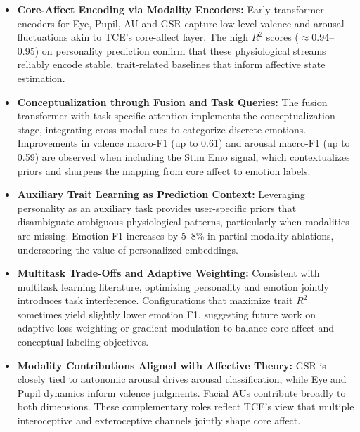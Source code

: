 \documentclass[sigconf]{acmart}
\begin{document}
\begin{itemize}
    \item \textbf{Core-Affect Encoding via Modality Encoders:} Early transformer encoders for Eye, Pupil, AU and GSR capture low-level valence and arousal fluctuations akin to TCE’s core-affect layer. The high $R^2$ scores ($\approx$0.94–0.95) on personality prediction confirm that these physiological streams reliably encode stable, trait-related baselines that inform affective state estimation.

    \item \textbf{Conceptualization through Fusion and Task Queries:} The fusion transformer with task-specific attention implements the conceptualization stage, integrating cross-modal cues to categorize discrete emotions. Improvements in valence macro-F1 (up to 0.61) and arousal macro-F1 (up to 0.59) are observed when including the Stim Emo signal, which contextualizes priors and sharpens the mapping from core affect to emotion labels.

    \item \textbf{Auxiliary Trait Learning as Prediction Context:} Leveraging personality as an auxiliary task provides user-specific priors that disambiguate ambiguous physiological patterns, particularly when modalities are missing. Emotion F1 increases by 5–8\% in partial-modality ablations, underscoring the value of personalized embeddings.

    \item \textbf{Multitask Trade-Offs and Adaptive Weighting:} Consistent with multitask learning literature, optimizing personality and emotion jointly introduces task interference. Configurations that maximize trait $R^2$ sometimes yield slightly lower emotion F1, suggesting future work on adaptive loss weighting or gradient modulation to balance core-affect and conceptual labeling objectives.

    \item \textbf{Modality Contributions Aligned with Affective Theory:} GSR is closely tied to autonomic arousal drives arousal classification, while Eye and Pupil dynamics inform valence judgments. Facial AUs contribute broadly to both dimensions. These complementary roles reflect TCE’s view that multiple interoceptive and exteroceptive channels jointly shape core affect.
\end{itemize}
\end{document}
